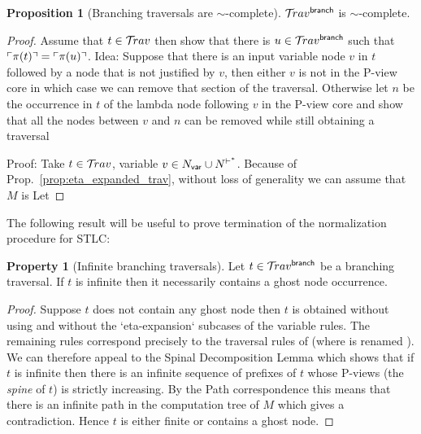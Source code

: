 \documentclass{article}
\theoremstyle{definition}
\newtheorem{property}{Property}[section]
\newtheorem{proposition}{Proposition}[section]
\newcommand\Nodes{N}%
\newcommand\NodesVar{N_{\sf var}}%
\newcommand{\ghostlmd}{{\lambda\!\!\lambda}}
\newcommand{\branching}{{\sf branch}}
\newcommand{\travsetbr}{{\travset^\branching}}
\newcommand{\travulc}{\travset}
\def\coresymbol{\pi} %
\newcommand{\core}[1]{\coresymbol(#1)} %
\newcommand{\enables}{\vdash} %
\newcommand{\NodeHjByRoot}{\Nodes^{\enables^*}} %
\begin{document}
\begin{proposition}[Branching traversals are $\sim$-complete]
\label{prop:branching_traversal_normalizing}
 $\travsetbr$ is $\sim$-complete.
\end{proposition}
\begin{proof}
Assume that $t\in\travulc$ then show that there is $u\in\travsetbr$ such that $\pview{\core{t}} = \pview{\core{u}}$.
Idea: Suppose that there is an input variable node $v$ in $t$ followed by a node that is not justified by $v$, then either $v$ is not in the P-view core in which case we can remove that section of the traversal. Otherwise let $n$ be the occurrence in $t$ of the lambda node following $v$ in the P-view core and  show that all the nodes between $v$ and $n$ can be removed while still obtaining a traversal

Proof: Take $t\in\travulc$, variable $v\in \NodesVar \union \NodeHjByRoot$.
Because of Prop.~\ref{prop:eta_expanded_trav}, without loss of generality we can assume
that $M$ is
Let
\end{proof}

The following result will be useful to prove termination of the normalization procedure for STLC:
\begin{property}[Infinite branching traversals]
\label{prop:branching_spine_property}
Let $t\in \travsetbr$ be a branching traversal. If $t$ is infinite then it necessarily contains a ghost node occurrence.
\end{property}
\begin{proof}
Suppose $t$ does not contain any ghost node then
$t$ is obtained without using \rulenamet{Lam^\ghostlmd_\branching} and without the `eta-expansion` subcases of the variable rules. The remaining rules correspond precisely to the traversal rules of
\cite{Ong2006} (where  is renamed ).
We can therefore appeal to the Spinal Decomposition Lemma
\cite[Lemma 14]{Ong2006} which shows that if $t$ is infinite then there is an infinite sequence of prefixes of $t$ whose P-views (the \emph{spine} of $t$) is strictly increasing. By the Path correspondence this means that there is an infinite path in the computation tree of $M$ which gives a contradiction. Hence $t$ is either finite or contains a ghost node.
\end{proof}
\end{document}
